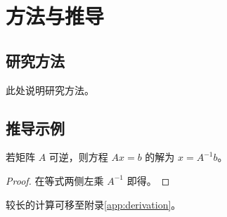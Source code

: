 \chapter{方法与推导}
\label{chap:method}

\section{研究方法}
此处说明研究方法。

\section{推导示例}
\begin{theorem}
若矩阵 \(A\) 可逆，则方程 \(Ax=b\) 的解为 \(x=A^{-1}b\)。
\end{theorem}
\begin{proof}
在等式两侧左乘 \(A^{-1}\) 即得。
\end{proof}

较长的计算可移至附录\ref{app:derivation}。
